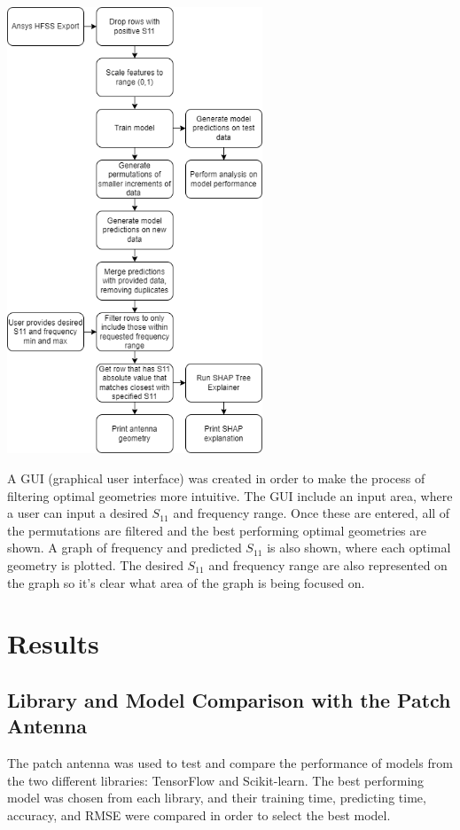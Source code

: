 \documentclass[lettersize,journal]{IEEEtran}
\newenvironment{Figure}
    {\par\medskip\noindent\minipage{\linewidth}}
    {\endminipage\par\medskip}
\begin{document}
\begin{Figure}
\centering
\includegraphics[width=3.0in]{methodology}
\label{data_flow}
\end{Figure}

A GUI (graphical user interface) was created in order to make the process of filtering optimal geometries more intuitive. The GUI include an input area, where a user can input a desired $S_{11}$ and frequency range. Once these are entered, all of the permutations are filtered and the best performing optimal geometries are shown. A graph of frequency and predicted $S_{11}$ is also shown, where each optimal geometry is plotted. The desired $S_{11}$ and frequency range are also represented on the graph so it's clear what area of the graph is being focused on.


\section{Results}
\subsection{Library and Model Comparison with the Patch Antenna}
The patch antenna was used to test and compare the performance of models from the two different libraries: TensorFlow and Scikit-learn. The best performing model was chosen from each library, and their training time, predicting time, accuracy, and RMSE were compared in order to select the best model.
\end{document}
